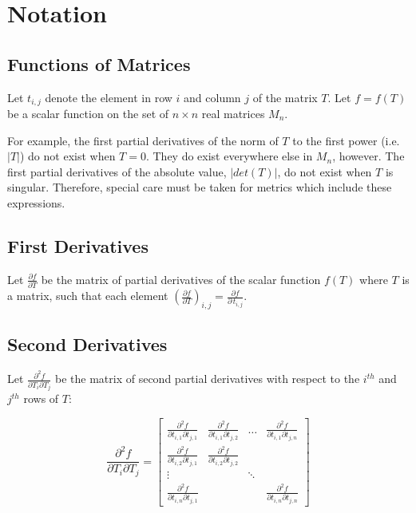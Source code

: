 \documentclass{report}
\begin{document}
\chapter{Notation}

\section{Functions of Matrices}

Let $t_{i,j}$ denote the element in row $i$ and column $j$ of the matrix $T$.
Let $f=f(T)$ be a scalar function on the set of $n \times n$ real matrices 
$M_n$. \newline

 For example, the first partial
derivatives of the norm of $T$ to the first power (i.e. $|T|$) do not exist 
when $T=0$. 
They do exist everywhere else in $M_n$, however.  The first partial 
derivatives of 
the absolute value, $|det(T)|$, do not exist when $T$ is singular. Therefore,
special care must be taken for metrics which include these expressions. 
\newline

\section{First Derivatives}

Let $\frac{\partial f}{\partial T}$ be the matrix of partial derivatives of the scalar function $f(T)$ where $T$ is a matrix, such that each element 
$\left(\frac{\partial f}{\partial T}\right)_{i,j} = \frac{\partial f}{\partial \, t_{i,j}}$.

\section{Second Derivatives}

Let $\frac{\partial^2 f}{\partial T_i \partial T_j}$ be the matrix of second partial derivatives with respect to the $i^{th}$ and $j^{th}$ rows of $T$:

\begin{equation}
\frac{\partial^2 f}{\partial T_i \partial T_j} = 
\left[ \begin{array}{cccc}
\frac{\partial^2 f}{\partial t_{i,1} \partial t_{j,1}} &
\frac{\partial^2 f}{\partial t_{i,1} \partial t_{j,2}} &
\ldots &
\frac{\partial^2 f}{\partial t_{i,1} \partial t_{j,n}} \\
\frac{\partial^2 f}{\partial t_{i,2} \partial t_{j,1}} &
\frac{\partial^2 f}{\partial t_{i,2} \partial t_{j,2}} \\
\vdots & & \ddots \\
\frac{\partial^2 f}{\partial t_{i,n} \partial t_{j,1}} & & &
\frac{\partial^2 f}{\partial t_{i,n} \partial t_{j,n}}
\end{array} \right]
\end{equation}
\end{document}
